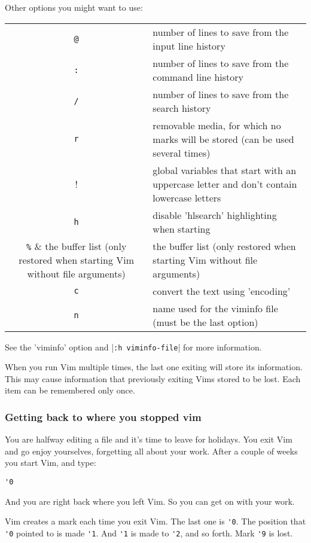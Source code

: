 Other options you might want to use:
\begin{center} \begin{longtable}{c l}
				\verb!@! & number of lines to save from the input line history \\
				\verb!:! & number of lines to save from the command line history \\
				\verb!/! & number of lines to save from the search history \\
				\verb!r! & removable media, for which no marks will be stored (can be used several times) \\
				\verb!!! & global variables that start with an uppercase letter and don't contain lowercase letters \\
				\verb!h! & disable 'hlsearch' highlighting when starting \\
				\verb!%! & the buffer list (only restored when starting Vim without file arguments) \\
				\verb!c! & convert the text using 'encoding' \\
				\verb!n! & name used for the viminfo file (must be the last option) \\
\end{longtable} \end{center}

See the 'viminfo' option and |\verb!:h viminfo-file!| for more information.

When you run Vim multiple times, the last one exiting will store its information.
This may cause information that previously exiting Vims stored to be lost.
Each item can be remembered only once.

\subsubsection{Getting back to where you stopped vim}
You are halfway editing a file and it's time to leave for holidays.
You exit Vim and go enjoy yourselves, forgetting all about your work.
After a couple of weeks you start Vim, and type:

\begin{Verbatim}[samepage=true]
 '0
\end{Verbatim}

And you are right back where you left Vim.
So you can get on with your work.

Vim creates a mark each time you exit Vim.
The last one is \verb!'0!.
The position that \verb!'0! pointed to is made \verb!'1!.
And \verb!'1! is made to \verb!'2!, and so forth.
Mark \verb!'9! is lost.

